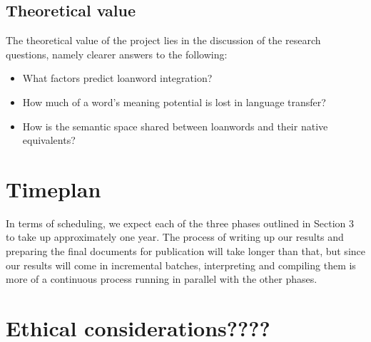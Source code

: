 \documentclass[a4paper]{article}
\begin{document}
\subsection{Theoretical value}
The theoretical value of the project lies in the discussion of the research questions, namely clearer answers to the following:
\begin{itemize}
	\item What factors predict loanword integration?
	\item How much of a word's meaning potential is lost in language transfer?
	\item How is the semantic space shared between loanwords and their native equivalents?	
\end{itemize}




\section{Timeplan}
In terms of scheduling, we expect each of the three phases outlined in Section 3 to take up approximately one year. The process of writing up our results and preparing the final documents for publication will take longer than that, but since our results will come in incremental batches, interpreting and compiling them is more of a continuous process running in parallel with the other phases.



\section{Ethical considerations????}


{}

\end{document}
